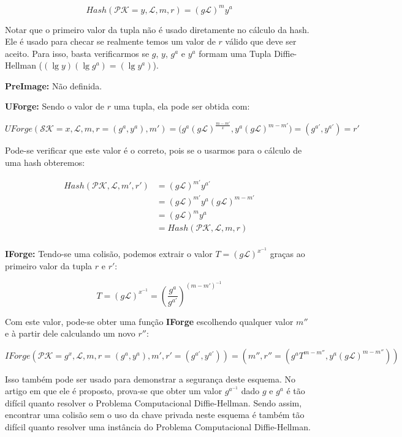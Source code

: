 \documentclass[a4paper]{article}
\begin{document}
$$
Hash(\mathcal{PK}=y, \mathcal{L}, m, r) = (g\mathcal{L})^my^a
$$

Notar que o primeiro valor da tupla não é usado diretamente no cálculo
da hash. Ele é usado para checar se realmente temos um valor de $r$
válido que deve ser aceito. Para isso, basta verificarmos se $g$, $y$,
$g^a$ e $y^a$ formam uma Tupla Diffie-Hellman ($(\lg y)(\lg g^a) =(\lg
y^a)$).

\textbf{PreImage:} Não definida.

\textbf{UForge:} Sendo o valor de $r$ uma tupla, ela pode ser obtida
com:

$$UForge(\mathcal{SK}=x, \mathcal{L}, m, r=(g^a,y^a), m') =
\big(g^a(g\mathcal{L})^{\frac{m-m'}{x}}, y^a(g\mathcal{L})^{m-m'}\big) =
(g^{a'}, y^{a'}) = r'
$$

Pode-se verificar que este valor é o correto, pois se o usarmos para o
cálculo de uma hash obteremos:

\begin{equation}
\begin{split}
  Hash(\mathcal{PK},\mathcal{L}, m', r') &= (g\mathcal{L})^{m'}y^{a'}\\
  &= (g\mathcal{L})^{m'}y^{a}(g\mathcal{L})^{m-m'}\\
  &= (g\mathcal{L})^{m}y^{a}\\
  &= Hash(\mathcal{PK},\mathcal{L}, m, r)\\
\end{split}
\end{equation}

\textbf{IForge:} Tendo-se uma colisão, podemos extrair o valor $T =
(g\mathcal{L})^{x^{-1}}$ graças ao primeiro valor da tupla $r$ e $r'$:

$$
T = (g\mathcal{L})^{x^{-1}} = \left(\frac{g^a}{g^{a'}}\right)^{(m-m')^{-1}}
$$

Com este valor, pode-se obter uma função \textbf{IForge} escolhendo
qualquer valor $m''$ e à partir dele calculando um novo $r''$:

$$ IForge(\mathcal{PK}=g^x, \mathcal{L}, m, r=(g^a, y^a), m',
r'=(g^{a'}, y^{a'})) = (m'', r''=(g^aT^{m-m''},
y^{a}(g\mathcal{L})^{m-m''}))
$$

Isso também pode ser usado para demonstrar a segurança deste
esquema. No artigo em que ele é proposto, prova-se que obter um valor
$g^{a^{-1}}$ dado $g$ e $g^a$ é tão difícil quanto resolver o Problema
Computacional Diffie-Hellman. Sendo assim, encontrar uma colisão sem o
uso da chave privada neste esquema é também tão difícil quanto
resolver uma instância do Problema Computacional Diffie-Hellman.
\end{document}
